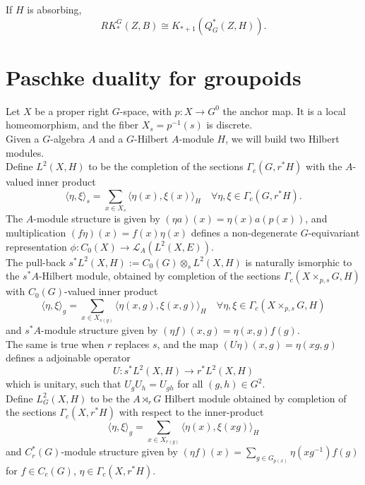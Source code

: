 If $H$ is absorbing, 
\[RK_*^G(Z,B) \cong K_{*+1}(Q^*_G(Z,H)).\]

\section{Paschke duality for groupoids}  %

Let $X$ be a proper right $G$-space, with $p: X \rightarrow G^0$ the anchor map. It is a local homeomorphism, and the fiber $X_s = p^{-1}(s)$ is discrete.\\

Given a $G$-algebra $A$ and a $G$-Hilbert $A$-module $H$, we will build two Hilbert modules.\\

Define $L^2(X,H)$ to be the completion of the sections $ \Gamma_c(G,r^* H)$ with the $A$-valued inner product
\[ \langle \eta, \xi \rangle_s = \sum_{x\in X_s}\langle \eta(x), \xi(x) \rangle_{H} \quad \forall \eta,\xi \in \Gamma_c(G,r^* H). \]
The $A$-module structure is given by $(\eta a)(x)=\eta(x)a(p(x))$, and multiplication $(f \eta)(x)= f(x)\eta(x)$ defines a non-degenerate $G$-equivariant representation $\phi : C_0(X)\rightarrow \mathcal L_A(L^2(X,E))$.\\

The pull-back $s^* L^2(X,H) := C_0(G)\otimes_s L^2(X,H) $ is naturally ismorphic to the $s^*A$-Hilbert module, obtained by completion of the sections $\Gamma_c (X\times_{p,s}G,H)$ with $C_0(G)$-valued inner product 
\[\langle \eta, \xi\rangle_g = \sum_{x\in X_{s(g)}} \langle \eta(x,g) , \xi(x,g) \rangle_H \quad \forall \eta ,\xi \in \Gamma_c (X\times_{p,s}G,H)\]
and $s^*A$-module structure given by $(\eta f)(x, g) = \eta(x,g)f(g)$.\\ 
The same is true when $r$ replaces $s$, and the map $(U\eta)(x,g) = \eta(xg,g)$ defines a adjoinable operator 
\[U : s^* L^2(X,H) \rightarrow r^* L^2(X,H)\]
which is unitary, such that $U_g U_h = U_{gh}$ for all $(g,h)\in G^2$.\\

Define $L^2_G(X,H)$ to be the $A\rtimes_r G$ Hilbert module obtained by completion of the sections $\Gamma_c(X,r^* H)$ with respect to the inner-product
\[ \langle \eta, \xi \rangle_g = \sum_{x\in X_{r(g)}} \langle \eta(x) , \xi(xg)\rangle_H \]
and $C_r^*(G)$-module structure given by $(\eta f)(x) = \sum_{g\in G_{p(x)}} \eta(xg^{-1})f(g)$ for $f\in C_c(G)$, $\eta\in \Gamma_c(X,r^* H)$.\\


